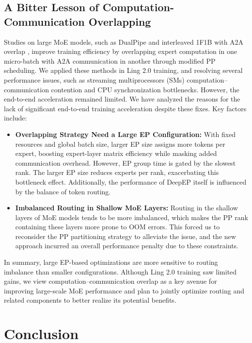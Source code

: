 \documentclass[table]{gtech}
\theoremstyle{definition}
\begin{document}
\subsection{A Bitter Lesson of Computation-Communication Overlapping}

Studies on large MoE models, such as DualPipe and interleaved 1F1B with A2A overlap \citep{deepseekai2024deepseekv3technicalreport,NeMo}, improve training efficiency by overlapping expert computation in one micro-batch with A2A communication in another through modified PP scheduling.
We applied these methods in Ling 2.0 training, and resolving several performance issues, such as streaming multiprocessors (SMs) computation–communication contention and CPU synchronization bottlenecks.
However, the end-to-end acceleration remained limited. We have analyzed the reasons for the lack of significant end-to-end training acceleration despite these fixes. Key factors include:

\begin{itemize}[leftmargin=1.5em]
    \item \textbf{Overlapping Strategy Need a Large EP Configuration:} With fixed resources and global batch size, larger EP size assigns more tokens per expert, boosting expert-layer matrix efficiency while masking added communication overhead. However, EP group time is gated by the slowest rank. The larger EP size reduces experts per rank, exacerbating this bottleneck effect. Additionally, the performance of DeepEP itself is influenced by the balance of token routing.
    \item \textbf{Imbalanced Routing in Shallow MoE Layers:} Routing in the shallow layers of MoE models tends to be more imbalanced, which makes the PP rank containing these layers more prone to OOM errors. This forced us to reconsider the PP partitioning strategy to alleviate the issue, and the new approach incurred an overall performance penalty due to these constraints.
\end{itemize}

In summary, large EP-based optimizations are more sensitive to routing imbalance than smaller configurations.
Although Ling 2.0 training saw limited gains, we view computation–communication overlap as a key avenue for improving large-scale MoE performance and plan to jointly optimize routing and related components to better realize its potential benefits.

\section{Conclusion}
\end{document}
